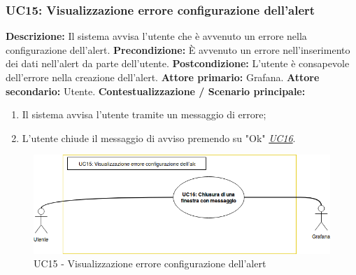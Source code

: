                 \subsubsection{UC15: Visualizzazione errore configurazione dell'alert}
                    \textbf{Descrizione:} Il sistema avvisa l’utente che è avvenuto un errore nella configurazione dell'alert.
                    \newline
                    \textbf{Precondizione:} \`E avvenuto un errore nell'inserimento dei dati nell'alert da parte dell'utente.
                    \newline
                    \textbf{Postcondizione:} L’utente è consapevole dell'errore nella creazione dell'alert.
                    \newline
                    \textbf{Attore primario:} Grafana.
                    \newline
                    \textbf{Attore secondario:} Utente.
                    \newline
                    \textbf{Contestualizzazione / Scenario principale:} \begin{enumerate}
                            \item Il sistema avvisa l’utente tramite un messaggio di errore;
                            \item L'utente chiude il messaggio di avviso premendo su "Ok" \underline{\textit{UC16}}.
                        \end{enumerate}
                        
                    \begin{figure}[!htbp]
                    	\centering
                    	\includegraphics[width=\textwidth]{UC15.png}
                    	\caption{UC15 - Visualizzazione errore configurazione dell'alert}
                    	\label{uc11}
                    \end{figure}
                        
